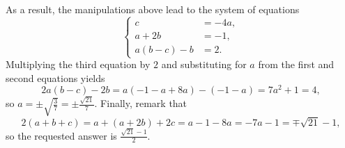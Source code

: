 \documentclass[10pt]{article}
\begin{document}
\begin{enumerate}
\par As a result, the manipulations above lead to the system of equations \[\begin{cases}c&=-4a,\\a+2b&=-1,\\a(b-c)-b&=2.\end{cases}\] Multiplying the third equation by $2$ and substituting for $a$ from the first and second equations yields \[2a(b-c)-2b = a(-1-a+8a)-(-1-a) = 7a^2+1=4,\] so $a = \pm\sqrt{\tfrac37}=\pm\tfrac{\sqrt{21}}7$.  Finally, remark that \[2(a+b+c) = a + (a+2b) + 2c = a - 1 - 8a = -7a - 1 = \mp\sqrt{21}-1,\] so the requested answer is $\boxed{\tfrac{\sqrt{21}-1}2}$.

\end{enumerate}
\end{document}
